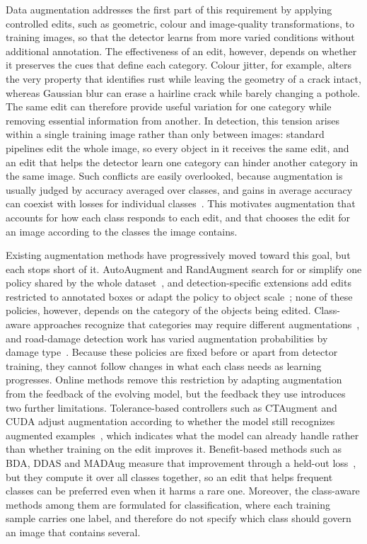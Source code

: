 \documentclass[conference]{IEEEtran}
\begin{document}
Data augmentation addresses the first part of this requirement by applying controlled edits, such as geometric, colour and image-quality transformations, to training images, so that the detector learns from more varied conditions without additional annotation. The effectiveness of an edit, however, depends on whether it preserves the cues that define each category. Colour jitter, for example, alters the very property that identifies rust while leaving the geometry of a crack intact, whereas Gaussian blur can erase a hairline crack while barely changing a pothole. The same edit can therefore provide useful variation for one category while removing essential information from another. In detection, this tension arises within a single training image rather than only between images: standard pipelines edit the whole image, so every object in it receives the same edit, and an edit that helps the detector learn one category can hinder another category in the same image. Such conflicts are easily overlooked, because augmentation is usually judged by accuracy averaged over classes, and gains in average accuracy can coexist with losses for individual classes~\cite{kirichenko2023}. This motivates augmentation that accounts for how each class responds to each edit, and that chooses the edit for an image according to the classes the image contains.

Existing augmentation methods have progressively moved toward this goal, but each stops short of it. AutoAugment and RandAugment search for or simplify one policy shared by the whole dataset~\cite{cubuk2019auto,cubuk2020rand}, and detection-specific extensions add edits restricted to annotated boxes or adapt the policy to object scale~\cite{zoph2020det,chen2021scale}; none of these policies, however, depends on the category of the objects being edited. Class-aware approaches recognize that categories may require different augmentations~\cite{tsuchiya2019,yoo2023,cheung2022adaaug}, and road-damage detection work has varied augmentation probabilities by damage type~\cite{rdd_detectron2}. Because these policies are fixed before or apart from detector training, they cannot follow changes in what each class needs as learning progresses. Online methods remove this restriction by adapting augmentation from the feedback of the evolving model, but the feedback they use introduces two further limitations. Tolerance-based controllers such as CTAugment and CUDA adjust augmentation according to whether the model still recognizes augmented examples~\cite{berthelot2020,ahn2023cuda}, which indicates what the model can already handle rather than whether training on the edit improves it. Benefit-based methods such as BDA, DDAS and MADAug measure that improvement through a held-out loss~\cite{lu2023bda,liu2021ddas,hou2023madaug}, but they compute it over all classes together, so an edit that helps frequent classes can be preferred even when it harms a rare one. Moreover, the class-aware methods among them are formulated for classification, where each training sample carries one label, and therefore do not specify which class should govern an image that contains several.
\end{document}

